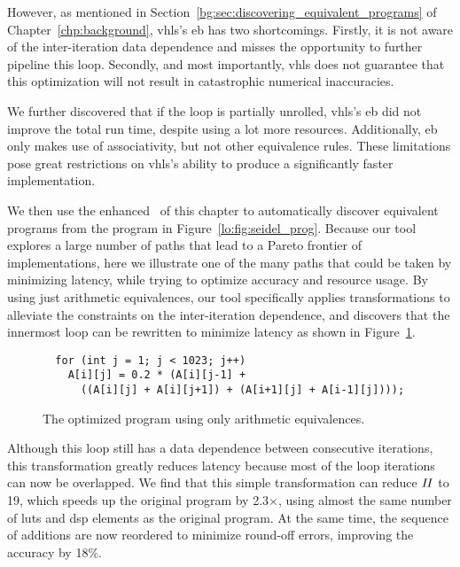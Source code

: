 However, as mentioned in Section~\ref{bg:sec:discovering_equivalent_programs}
of Chapter~\ref{chp:background}, \gls{vhls}'s \gls{eb} has two shortcomings.
Firstly, it is not aware of the inter-iteration data dependence and misses the
opportunity to further pipeline this loop.  Secondly, and most importantly,
\gls{vhls} does not guarantee that this optimization will not result in
catastrophic numerical inaccuracies.

We further discovered that if the loop is partially unrolled, \gls{vhls}'s
\gls{eb} did not improve the total run time, despite using a lot more
resources.  Additionally, \gls{eb} only makes use of associativity, but
not other equivalence rules.  These limitations pose great restrictions on
\gls{vhls}'s ability to produce a significantly faster implementation.

We then use the enhanced \soap~of this chapter to automatically discover
equivalent programs from the program in Figure~\ref{lo:fig:seidel_prog}.
Because our tool explores a large number of paths that lead to a Pareto
frontier of implementations, here we illustrate one of the many paths that
could be taken by minimizing latency, while trying to optimize accuracy and
resource usage.  By using just arithmetic equivalences, our tool specifically
applies transformations to alleviate the constraints on the inter-iteration
dependence, and discovers that the innermost loop can be rewritten to minimize
latency as shown in Figure~\ref{lo:fig:seidel_prog_2}.

\begin{figure}[ht]
\begin{lstlisting}
  for (int j = 1; j < 1023; j++)
    A[i][j] = 0.2 * (A[i][j-1] +
      ((A[i][j] + A[i][j+1]) + (A[i+1][j] + A[i-1][j])));
\end{lstlisting}
    \caption{The optimized program using only arithmetic equivalences.}
    \label{lo:fig:seidel_prog_2}
\end{figure}

Although this loop still has a data dependence between consecutive iterations,
this transformation greatly reduces latency because most of the loop iterations
can now be overlapped.  We find that this simple transformation can reduce
$\mathit{II}$ to 19, which speeds up the original program by 2.3$\times$, using almost
the same number of \glspl{lut} and \gls{dsp} elements as the original program.
At the same time, the sequence of additions are now reordered to minimize
round-off errors, improving the accuracy by 18\%.

